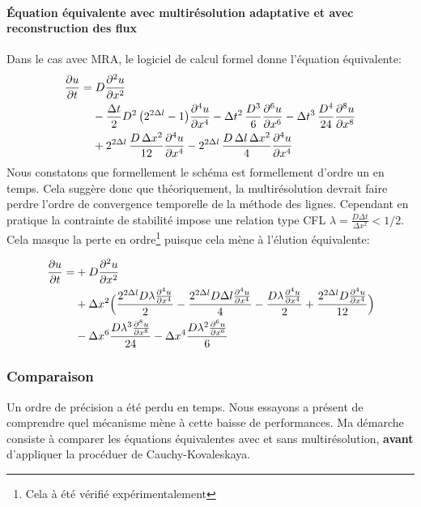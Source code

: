 \paragraph{Équation équivalente avec multirésolution adaptative et avec reconstruction des flux}
    Dans le cas avec MRA, le logiciel de calcul formel donne l'équation équivalente:
    \begin{align}
        \frac{\partial u}{\partial t} =&\; D \frac{\partial^2 u}{\partial x^2} \\\notag
        &- \frac{\Delta t}{2} D^2\, \bigl( 2^{2\Delta l}- 1 \bigr)          \frac{\partial^4 u}{\partial x^4}
        - \Delta t^2\, \frac{D^3}{6}          \frac{\partial^6 u}{\partial x^6}
        - \Delta t^3\, \frac{D^4}{24}         \frac{\partial^8 u}{\partial x^8} \\\notag
        &+ 2^{2\Delta l}\, \frac{D\, \Delta x^2}{12}    \frac{\partial^4 u}{\partial x^4}
        - 2^{2\Delta l}\, \frac{D\, \Delta l\, \Delta x^2}{4} \frac{\partial^4 u}{\partial x^4}
    \end{align}
    Nous constatons que formellement le schéma est formellement d'ordre un en temps.
    Cela suggère donc que théoriquement, la multirésolution devrait faire perdre l'ordre de convergence temporelle de la méthode des lignes.
    Cependant en pratique la contrainte de stabilité impose une relation type CFL $\lambda = \frac{D \Delta t } {\Delta x^2} < 1/2$.
    Cela masque la perte en ordre\footnote{Cela à été vérifié expérimentalement} puisque cela mène à l’élution équivalente:

    \begin{align}
        \frac{\partial u}{\partial t}
        =&+ D \frac{\partial^{2}u}{\partial x^{2}}\\\notag
        &+ \Delta x^{2}\Bigl(\frac{2^{2 \Delta l} D  \lambda \frac{\partial^{4}u}{\partial x^{4}}}{2} 
        -  \frac{2^{2 \Delta l} D \Delta l \frac{\partial^{4}u}{\partial x^{4}}}{4} 
        -  \frac{D \lambda \frac{\partial^{4}u}{\partial x^{4}}}{2} 
        +  \frac{2^{2 \Delta l} D\frac{\partial^{4}u}{\partial x^{4}}}{12}\Bigr)\\\notag
        &- \Delta x^{6} \frac{D \lambda^{3} \frac{\partial^{8}u}{\partial x^{8}}}{24} 
        - \Delta x^{4} \frac{D \lambda^{2} \frac{\partial^{6}u}{\partial x^{6}}}{6} 
    \end{align}
\subsubsection{Comparaison}
    Un ordre de précision a été perdu en temps. Nous essayons a présent de comprendre quel mécanisme mène à cette baisse de performances.
    Ma démarche consiste à comparer les équations équivalentes avec et sans multirésolution, \textbf{avant} d'appliquer la procéduer de Cauchy-Kovaleskaya.
